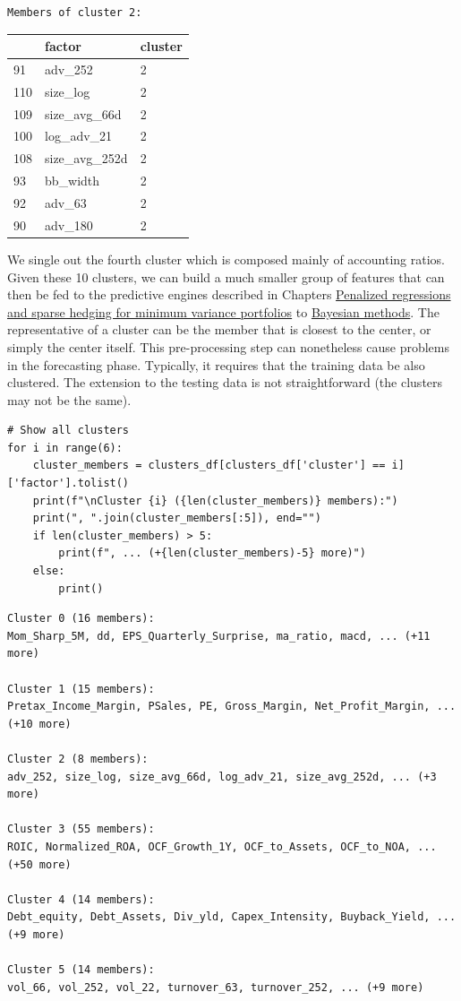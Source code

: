 \begin{verbatim}
Members of cluster 2:
\end{verbatim}

\bigskip\noindent
\begin{tabular}{p{}p{}p{}}
\toprule
 & factor & cluster \\
\hline
91 & adv\_252 & 2 \\
\hline
110 & size\_log & 2 \\
\hline
109 & size\_avg\_66d & 2 \\
\hline
100 & log\_adv\_21 & 2 \\
\hline
108 & size\_avg\_252d & 2 \\
\hline
93 & bb\_width & 2 \\
\hline
92 & adv\_63 & 2 \\
\hline
90 & adv\_180 & 2 \\
\hline
\bottomrule
\end{tabular}

\bigskip

We single out the fourth cluster which is composed mainly of accounting ratios. Given these 10 clusters, we can build a much smaller group of features that can then be fed to the predictive engines described in Chapters \href{/chap-06-lasso}{Penalized regressions and sparse hedging for minimum variance portfolios} to \href{/chap-11-bayes}{Bayesian methods}. The representative of a cluster can be the member that is closest to the center, or simply the center itself. This pre-processing step can nonetheless cause problems in the forecasting phase. Typically, it requires that the training data be also clustered. The extension to the testing data is not straightforward (the clusters may not be the same).

\begin{verbatim}
# Show all clusters
for i in range(6):
    cluster_members = clusters_df[clusters_df['cluster'] == i]['factor'].tolist()
    print(f"\nCluster {i} ({len(cluster_members)} members):")
    print(", ".join(cluster_members[:5]), end="")
    if len(cluster_members) > 5:
        print(f", ... (+{len(cluster_members)-5} more)")
    else:
        print()
\end{verbatim}

\begin{verbatim}
Cluster 0 (16 members):
Mom_Sharp_5M, dd, EPS_Quarterly_Surprise, ma_ratio, macd, ... (+11 more)

Cluster 1 (15 members):
Pretax_Income_Margin, PSales, PE, Gross_Margin, Net_Profit_Margin, ... (+10 more)

Cluster 2 (8 members):
adv_252, size_log, size_avg_66d, log_adv_21, size_avg_252d, ... (+3 more)

Cluster 3 (55 members):
ROIC, Normalized_ROA, OCF_Growth_1Y, OCF_to_Assets, OCF_to_NOA, ... (+50 more)

Cluster 4 (14 members):
Debt_equity, Debt_Assets, Div_yld, Capex_Intensity, Buyback_Yield, ... (+9 more)

Cluster 5 (14 members):
vol_66, vol_252, vol_22, turnover_63, turnover_252, ... (+9 more)
\end{verbatim}

